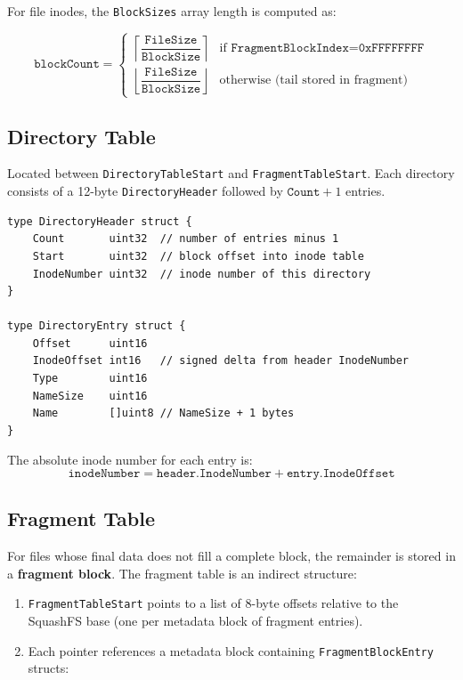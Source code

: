 \documentclass[11pt,a4paper]{article}
\begin{document}
For file inodes, the \texttt{BlockSizes} array length is computed as:

\[
  \texttt{blockCount} =
  \begin{cases}
    \left\lceil \dfrac{\texttt{FileSize}}{\texttt{BlockSize}} \right\rceil
      & \text{if } \texttt{FragmentBlockIndex} = \texttt{0xFFFFFFFF} \\[8pt]
    \left\lfloor \dfrac{\texttt{FileSize}}{\texttt{BlockSize}} \right\rfloor
      & \text{otherwise (tail stored in fragment)}
  \end{cases}
\]

\subsection{Directory Table}

Located between \texttt{DirectoryTableStart} and
\texttt{FragmentTableStart}. Each directory consists of a 12-byte
\texttt{DirectoryHeader} followed by \(\texttt{Count} + 1\) entries.

\begin{lstlisting}[style=gostyle]
type DirectoryHeader struct {
    Count       uint32  // number of entries minus 1
    Start       uint32  // block offset into inode table
    InodeNumber uint32  // inode number of this directory
}

type DirectoryEntry struct {
    Offset      uint16
    InodeOffset int16   // signed delta from header InodeNumber
    Type        uint16
    NameSize    uint16
    Name        []uint8 // NameSize + 1 bytes
}
\end{lstlisting}

The absolute inode number for each entry is:
\[
  \texttt{inodeNumber} =
  \texttt{header.InodeNumber} + \texttt{entry.InodeOffset}
\]

\subsection{Fragment Table}

For files whose final data does not fill a complete block, the remainder
is stored in a \textbf{fragment block}. The fragment table is an indirect
structure:

\begin{enumerate}
    \item \texttt{FragmentTableStart} points to a list of 8-byte offsets
      relative to the SquashFS base (one per metadata block of fragment
      entries).
    \item Each pointer references a metadata block containing
          \texttt{FragmentBlockEntry} structs:
\end{enumerate}
\end{document}
